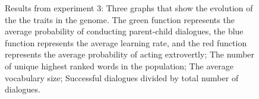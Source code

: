 \begin{figure}
    \centering
    \ContinuedFloat
    \hfill
    \par \bigskip
    \hfill
    \caption{Results from experiment 3:  Three graphs that show the evolution of the the traits in the genome. The green function represents the average probability of conducting parent-child dialogues, the blue function represents the average learning rate, and the red function represents the average probability of acting extrovertly;  The number of unique highest ranked words in the population;  The average vocabulary size;  Successful dialogues divided by total number of dialogues.}
    \label{fig:exp3.1}
\end{figure}

